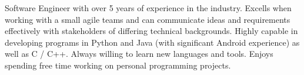 \begin{cvletter}

Software Engineer with over 5 years of experience in the industry. Excells when working with a small agile teams and can communicate ideas and requirements effectively with stakeholders of differing technical backgrounds. Highly capable in developing programs in Python and Java (with significant Android experience) as well as C / C++. Always willing to learn new languages and tools. Enjoys spending free time working on personal programming projects.

\end{cvletter}


